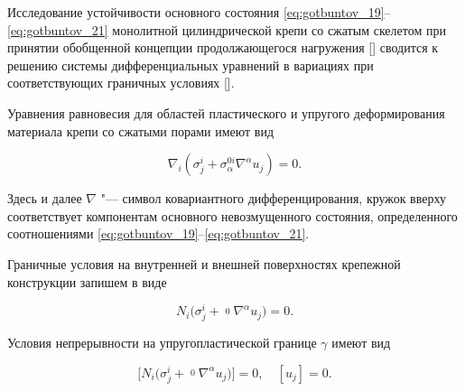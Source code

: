 \smallskip




Исследование устойчивости основного состояния \eqref{eq:gotbuntov_19}--\eqref{eq:gotbuntov_21} монолитной цилиндрической крепи со сжатым скелетом при принятии обобщенной концепции продолжающегося нагружения [] сводится к решению системы дифференциальных уравнений в вариациях при соответствующих граничных условиях [].



Уравнения равновесия для областей пластического и упругого деформирования материала крепи со сжатыми порами имеют вид

\begin{equation} 

\label{eq:gotbuntov_23} 

\nabla_i(\sigma_j^i+\sigma_{\alpha}^{0i}\nabla^{\alpha}u_j)=0.   

\end{equation}           

Здесь и далее $\nabla$ "--- символ ковариантного дифференцирования, кружок вверху соответствует компонентам основного невозмущенного состояния, определенного соотношениями \eqref{eq:gotbuntov_19}--\eqref{eq:gotbuntov_21}.



Граничные условия на внутренней и внешней поверхностях крепежной конструкции запишем в виде

\begin{equation} 

\label{eq:gotbuntov_25} 

N_i\bigl(\sigma_j^i+\mathop{\sigma_{\alpha}^i}\limits^{0}\nabla^{\alpha}u_j\bigr)=0. 

\end{equation}                             



Условия непрерывности на упругопластической границе $\gamma$ имеют вид

\begin{equation} 

\label{eq:gotbuntov_25} 

\bigl[N_i\bigl(\sigma_j^i+\mathop{\sigma_{\alpha}^i}\limits^{0}\nabla^{\alpha}u_j\bigr)\bigr]=0, \quad [u_j]=0.  

\end{equation}



